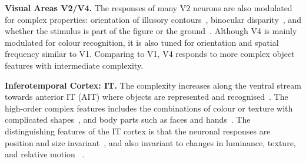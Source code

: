 \documentclass[journal]{journal}
\begin{document}
\textbf{Visual Areas V2/V4.}
The responses of many V2 neurons are also modulated for complex properties: orientation of illusory contours~\cite{anzai2007neurons}, binocular disparity~\cite{daniel2009whither}, and whether the stimulus is part of the figure or the ground~\cite{qiu2005figure}.
%
Although V4 is mainly modulated for colour recognition, it is also tuned for orientation and spatial frequency similar to V1.
Comparing to V1, V4 responds to more complex object features with intermediate complexity.

\textbf{Inferotemporal Cortex: IT.}
The complexity increases along the ventral stream towards anterior IT (AIT) where objects are represented and recognised~\cite{dean1976effects}.
The high-order complex features includes the combinations of colour or texture with complicated shapes~\cite{tanaka1991coding}, and body parts such as faces and hands~\cite{gross2008single}.
The distinguishing features of the IT cortex is that the neuronal responses are position and size invariant~\cite{schwartz1983shape}, and also invariant to changes in luminance, texture, and relative motion ~\cite{sary1993cue}.
\end{document}
